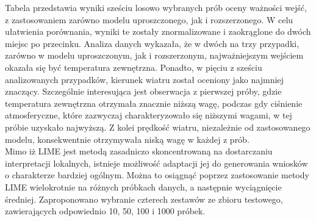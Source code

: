\documentclass[a4paper,twoside,12pt]{book}
\begin{document}
Tabela przedstawia wyniki sześciu losowo wybranych prób oceny ważności wejść, z zastosowaniem zarówno modelu uproszczonego, jak i rozszerzonego. W celu ułatwienia porównania, wyniki te zostały znormalizowane i zaokrąglone do dwóch miejsc po przecinku. Analiza danych wykazała, że w dwóch na trzy przypadki, zarówno w modelu uproszczonym, jak i rozszerzonym, najważniejszym wejściem okazała się być temperatura zewnętrzna. Ponadto, w pięciu z sześciu analizowanych przypadków, kierunek wiatru został oceniony jako najmniej znaczący. Szczególnie interesująca jest obserwacja z pierwszej próby, gdzie temperatura zewnętrzna otrzymała znacznie niższą wagę, podczas gdy ciśnienie atmosferyczne, które zazwyczaj charakteryzowało się niższymi wagami, w tej próbie uzyskało najwyższą. Z kolei prędkość wiatru, niezależnie od zastosowanego modelu, konsekwentnie otrzymywała niską wagę w każdej z prób.\\

Mimo iż LIME jest metodą zasadniczo skoncentrowaną na dostarczaniu interpretacji lokalnych, istnieje możliwość adaptacji jej do generowania wniosków o charakterze bardziej ogólnym. Można to osiągnąć poprzez zastosowanie metody LIME wielokrotnie na różnych próbkach danych, a następnie wyciągnięcie średniej. Zaproponowano wybranie czterech zestawów ze zbioru testowego, zawierających odpowiednio 10, 50, 100 i 1000 próbek.
\end{document}
